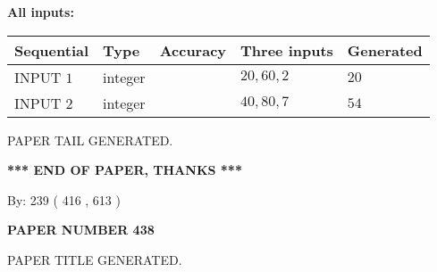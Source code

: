 \documentclass[12pt]{article}
\begin{document}
   
   
   
\noindent\vspace{0.1in}\hspace{-0.08in} {\textbf{\Large{All inputs: }}}
   
   
  
  
\noindent\begin{tabular}{|l|l|l|l|l|}
\hline
 Sequential & Type & Accuracy & Three inputs & Generated \\ 
\hline
 
 
  INPUT $  1 $ & integer &  & $
 20
 , 
 60
 , 
 2
 $ & $ 20 $ 
 \\  \hline  
 
 
  INPUT $  2 $ & integer &  & $
 40
 , 
 80
 , 
 7
 $ & $ 54 $ 
 \\  \hline  
 \end{tabular}
   
   
   
   
   
   
 \vspace{0.2in}
 
   
   
\vspace{2.0in} PAPER TAIL GENERATED.
   
   
   
   
\vspace{1.0in} 
{\textbf{\large{ *** END OF PAPER, THANKS *** }}} 
   
   
\hspace{1.0in} By: 
 239 ( 416 ,  613 )
   
   
   
   
\newpage 
\setcounter{page}{ 
   438001 } 
   
   
   
   
 {\textbf{ \Large{ PAPER NUMBER  438  }}}
   
   
\vspace{0.2in}
   
   
   
   
   
   
   
   
 \vspace{0.2in}
 
 
 
 
   
   
 PAPER TITLE GENERATED.
   
   
   
\vspace{0.2in}
   
\end{document}
